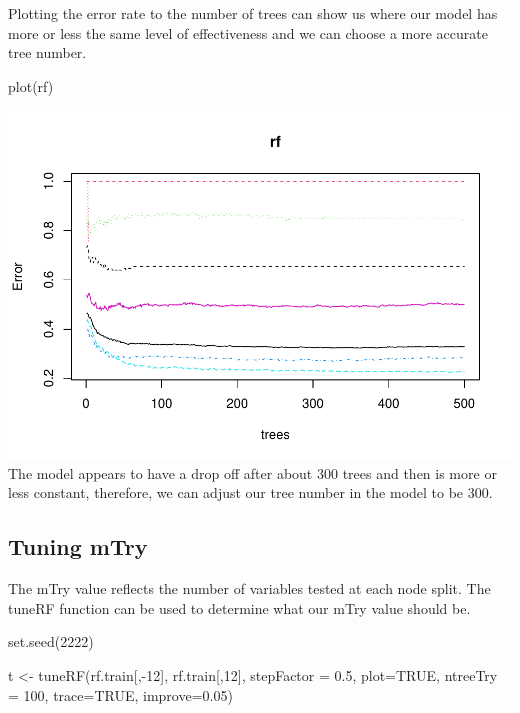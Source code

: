 \documentclass[
]{book}
\newenvironment{Shaded}{\begin{snugshade}}{\end{snugshade}}
\newcommand{\AttributeTok}[1]{\textcolor[rgb]{0.77,0.63,0.00}{#1}}
\newcommand{\ConstantTok}[1]{\textcolor[rgb]{0.00,0.00,0.00}{#1}}
\newcommand{\DecValTok}[1]{\textcolor[rgb]{0.00,0.00,0.81}{#1}}
\newcommand{\FloatTok}[1]{\textcolor[rgb]{0.00,0.00,0.81}{#1}}
\newcommand{\FunctionTok}[1]{\textcolor[rgb]{0.00,0.00,0.00}{#1}}
\newcommand{\NormalTok}[1]{#1}
\newcommand{\OtherTok}[1]{\textcolor[rgb]{0.56,0.35,0.01}{#1}}
\newcommand{\SpecialCharTok}[1]{\textcolor[rgb]{0.00,0.00,0.00}{#1}}
\begin{document}
Plotting the error rate to the number of trees can show us where our model has more or less the same level of effectiveness and we can choose a more accurate tree number.

\begin{Shaded}
\begin{Highlighting}[]
\FunctionTok{plot}\NormalTok{(rf)}
\end{Highlighting}
\end{Shaded}

\includegraphics{FinalProject-Bright-Santoro_files/figure-latex/unnamed-chunk-18-1.pdf}
The model appears to have a drop off after about 300 trees and then is more or less constant, therefore, we can adjust our tree number in the model to be 300.

\hypertarget{tuning-mtry}{%
\subsection{Tuning mTry}\label{tuning-mtry}}

The mTry value reflects the number of variables tested at each node split. The tuneRF function can be used to determine what our mTry value should be.

\begin{Shaded}
\begin{Highlighting}[]
\FunctionTok{set.seed}\NormalTok{(}\DecValTok{2222}\NormalTok{)}

\NormalTok{t }\OtherTok{\textless{}{-}} \FunctionTok{tuneRF}\NormalTok{(rf.train[,}\SpecialCharTok{{-}}\DecValTok{12}\NormalTok{], rf.train[,}\DecValTok{12}\NormalTok{], }
       \AttributeTok{stepFactor =} \FloatTok{0.5}\NormalTok{, }
       \AttributeTok{plot=}\ConstantTok{TRUE}\NormalTok{,}
       \AttributeTok{ntreeTry =} \DecValTok{100}\NormalTok{,}
       \AttributeTok{trace=}\ConstantTok{TRUE}\NormalTok{,}
       \AttributeTok{improve=}\FloatTok{0.05}\NormalTok{)}
\end{Highlighting}
\end{Shaded}
\end{document}
